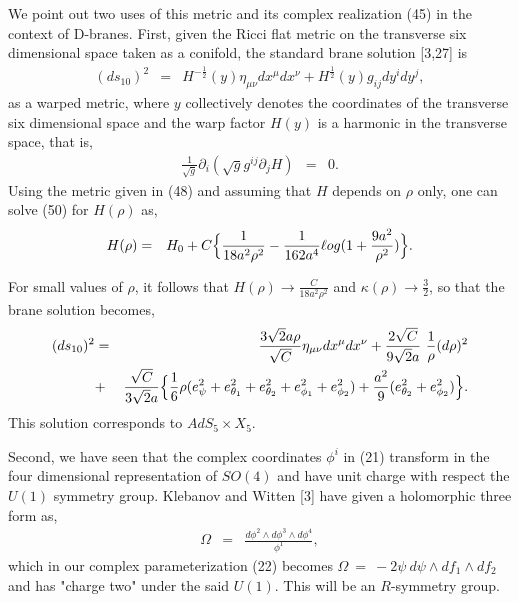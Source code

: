 \documentclass[a4paper,12pt]{article}
\begin{document}
We point out two uses of this metric and its complex realization (45) in the 
context of D-branes. First, given the Ricci flat metric on the transverse 
six dimensional space taken as a conifold, the standard brane solution 
[3,27] is
\begin{eqnarray}
(ds_{10})^2&=& H^{-\frac{1}{2}}(y) {\eta}_{\mu\nu}dx^{\mu}dx^{\nu} + 
H^{\frac{1}{2}}(y) g_{ij}dy^idy^j,
\end{eqnarray}
as a warped metric, where $y$ collectively denotes the coordinates of the 
transverse six dimensional space and  
the warp factor $H(y)$ is a harmonic  in
the transverse space, that is,
\begin{eqnarray}
\frac{1}{\sqrt{g}}{\partial}_i(\sqrt{g} g^{ij}{\partial}_jH)&=&0.
\end{eqnarray}
Using the metric given in (48) and assuming that  
$H$  
 depends on $\rho$ only, one can solve (50) for $H(\rho)$ as,  
\begin{eqnarray}
H(\rho) &=& H_0+C\Bigl\{ \frac{1}{18a^2{\rho}^2} - \frac{1}{162a^4} \ell og (
1+ \frac{9a^2}{{\rho}^2})\Bigr\}.
\end{eqnarray}

For small values of $\rho$, it follows that $H(\rho) \rightarrow \frac{
C}{18a^2{\rho}^2}$ and $\kappa (\rho) \rightarrow \frac{3}{2}$, so that 
the brane solution becomes,
\begin{eqnarray}
(ds_{10})^2 &=& \frac{3\sqrt{2}a\rho}{\sqrt{C}}{\eta}_{\mu\nu}dx^{\mu}
dx^{\nu} + \frac{2\sqrt{C}}{9\sqrt{2}a} \ \frac{1}{\rho} (d\rho )^2 
\nonumber \\
&+& \frac{\sqrt{C}}{3\sqrt{2}a}\Bigl\{ \frac{1}{6}\rho (e^2_{\psi} +
e^2_{{\theta}_1}+e^2_{{\theta}_2}+e^2_{{\phi}_1}+e^2_{{\phi}_2}) 
+\frac{a^2}{9}(e^2_{{\theta}_2}+e^2_{{\phi}_2})\Bigr\}. 
\end{eqnarray}
This solution corresponds to $AdS_5 \times X_5$.  

Second, we have seen that the complex coordinates ${\phi}^i$ in (21) 
transform in the four dimensional representation of $SO(4)$ and have 
unit charge with respect the $U(1)$ symmetry group. Klebanov and Witten [3]
have given a holomorphic three form as,
\begin{eqnarray}
\Omega &=& \frac{d{\phi}^2\wedge d{\phi}^3\wedge d{\phi}^4}{{\phi}^1},
\end{eqnarray}
which in our complex parameterization (22) becomes $\Omega \ =\ -2\psi \ 
d\psi \wedge df_1 \wedge df_2$ and has "charge two" under the said $U(1)$. 
This will be an $R$-symmetry group. 
\end{document}
